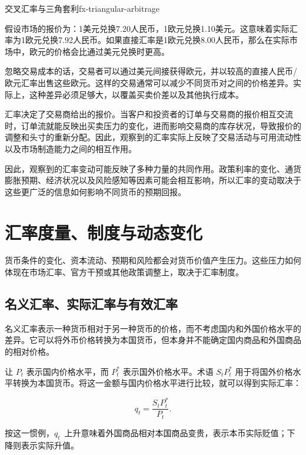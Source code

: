 \begin{example}{交叉汇率与三角套利}{fx-triangular-arbitrage}

假设市场的报价为：1美元兑换7.20人民币，1欧元兑换1.10美元。这意味着实际汇率为1欧元兑换7.92人民币。如果直接汇率是1欧元兑换8.00人民币，那么在实际市场中，欧元的价格会比通过美元兑换时更高。

忽略交易成本的话，交易者可以通过美元间接获得欧元，并以较高的直接人民币/欧元汇率出售这些欧元。这样的交易通常可以减少不同货币对之间的价格差异。实际上，这种差异必须足够大，以覆盖买卖价差以及其他执行成本。

\end{example}

汇率决定了交易商给出的报价。当客户和投资者的订单与交易商的报价相互交流时，订单流就能反映出买卖压力的变化，进而影响交易商的库存状况，导致报价的调整和头寸的重新分配。因此，观察到的汇率实际上反映了交易活动与可用流动性以及市场制造能力之间的相互作用。

因此，观察到的汇率变动可能反映了多种力量的共同作用。政策利率的变化、通货膨胀预期、经济状况以及风险感知等因素可能会相互影响，所以汇率的变动取决于这些更广泛的信息如何影响不同货币的预期回报。


\section{汇率度量、制度与动态变化}

货币条件的变化、资本流动、预期和风险都会对货币价值产生压力。这些压力如何体现在市场汇率、官方干预或其他政策调整上，取决于汇率制度。

\subsection{名义汇率、实际汇率与有效汇率}

名义汇率表示一种货币相对于另一种货币的价格，而不考虑国内和外国价格水平的差异。它可以将外币价格转换为本国货币，但本身并不能确定国内商品和外国商品的相对价格。

让 $P_t$ 表示国内价格水平，而 $P_t^*$ 表示国外价格水平。术语 $S_tP_t^*$ 用于将国外价格水平转换为本国货币。将这一金额与国内价格水平进行比较，就可以得到实际汇率：

\begin{equation}
q_t
=
\frac{S_t P_t^{*}}{P_t}.
\label{eq:ch10-real-exchange-rate}
\end{equation}

按这一惯例，$q_t$~上升意味着外国商品相对本国商品变贵，表示本币实际贬值；下降则表示实际升值。

